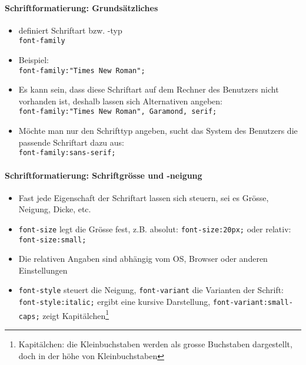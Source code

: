 \paragraph{Schriftformatierung: Grundsätzliches}
\begin{itemize}[noitemsep,topsep=0pt,leftmargin=*]
    \item definiert Schriftart bzw. -typ\\
    \texttt{font-family}
    \item Beispiel:\\
    \verb|font-family:"Times New Roman";|
    \item Es kann sein, dass diese Schriftart auf dem Rechner des Benutzers nicht vorhanden ist, deshalb lassen sich Alternativen angeben:\\
    \verb|font-family:"Times New Roman", Garamond, serif;|
    \item Möchte man nur den Schrifttyp angeben, sucht das System des Benutzers die passende Schriftart dazu aus:\\
    \texttt{font-family:sans-serif;}
\end{itemize}

\paragraph{Schriftformatierung: Schriftgrösse und -neigung}
\begin{itemize}[noitemsep,topsep=0pt,leftmargin=*]
    \item Fast jede Eigenschaft der Schriftart lassen sich steuern, sei es Grösse, Neigung, Dicke, etc.
    \item \texttt{font-size} legt die Grösse fest, z.B. absolut: \texttt{font-size:20px;} oder relativ: \texttt{font-size:small;}
    \item Die relativen Angaben sind abhängig vom OS, Browser oder anderen Einstellungen
    \item \texttt{font-style} steuert die Neigung, \texttt{font-variant} die Varianten der Schrift: \texttt{font-style:italic;} ergibt eine kursive Darstellung, \texttt{font-variant:small-caps;} zeigt Kapitälchen\footnote{Kapitälchen: die Kleinbuchstaben werden als grosse Buchstaben dargestellt, doch in der höhe von Kleinbuchstaben}
\end{itemize}

